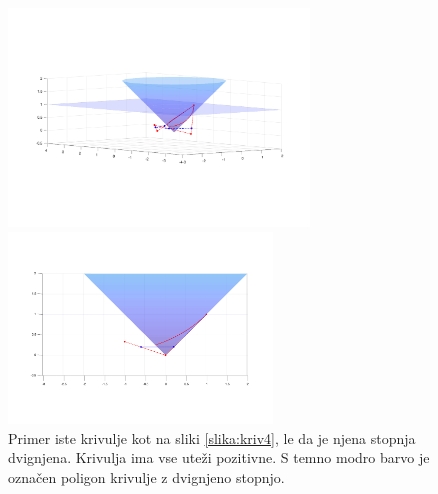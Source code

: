 \documentclass[a4paper,11pt]{article}
\theoremstyle{definition}
\theoremstyle{plain}
\begin{document}
\begin{figure}[ht!]
    \begin{minipage}{0.5\textwidth}
        \centering
        \includegraphics[width=80mm]{kriv4_2a.png}
    \end{minipage}\hfill
    \begin{minipage}{0.5\textwidth}
        \centering
        \includegraphics[width=70mm]{kriv4_2c.png}
    \end{minipage}\hfill
    \caption{Primer iste krivulje kot na sliki \ref{slika:kriv4}, le da je njena stopnja dvignjena. Krivulja ima vse uteži pozitivne. S temno modro barvo je označen poligon krivulje z dvignjeno stopnjo.}
    \label{slika:kriv4a}
\end{figure}
\end{document}
